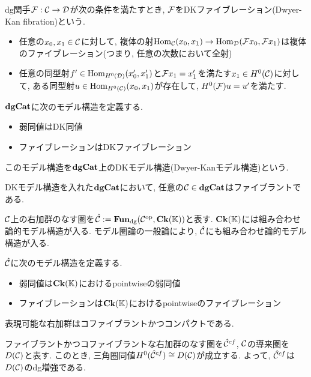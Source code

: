 \documentclass[uplatex, a4paper, 14Q, dvipdfmx]{jsarticle}
\begin{document}
\begin{definition}[DKファイブレーション]
  dg関手$\mathcal{F} : \mathcal{C} \to \mathcal{D}$が次の条件を満たすとき, $\mathcal{F}$をDKファイブレーション(Dwyer-Kan fibration)という.
  \begin{itemize}
    \item 任意の$x_0,x_1 \in \mathcal{C}$に対して, 複体の射$\mathrm{Hom}_{\mathcal{C}}(x_0,x_1) \to \mathrm{Hom}_{\mathcal{D}}(\mathcal{F} x_0,\mathcal{F} x_1)$は複体のファイブレーション(つまり, 任意の次数において全射)
    \item 任意の同型射$f' \in \mathrm{Hom}_{H^0(\mathcal{D})}(x_0',x_1')$と$\mathcal{F} x_1 = x_1'$を満たす$x_1 \in H^0(\mathcal{C})$に対して, ある同型射$u \in \mathrm{Hom}_{H^0(\mathcal{C})}(x_0,x_1)$が存在して, $H^0(\mathcal{F}) u = u'$を満たす. 
  \end{itemize}
\end{definition}

\begin{definition}
  $\mathbf{dgCat}$に次のモデル構造を定義する.
  \begin{itemize}
    \item 弱同値はDK同値
    \item ファイブレーションはDKファイブレーション
  \end{itemize}
  このモデル構造を$\mathbf{dgCat}$上のDKモデル構造(Dwyer-Kanモデル構造)という. 
\end{definition}

\begin{remark}
  DKモデル構造を入れた$\mathbf{dgCat}$において, 任意の$\mathcal{C} \in \mathbf{dgCat}$はファイブラントである. 
\end{remark}

$\mathcal{C}$上の右加群のなす圏を$\hat{\mathcal{C}} := \mathbf{Fun}_{\mathrm{dg}}(\mathcal{C}^{\mathrm{op}},\mathbf{Ck}(\mathbb{K}))$と表す. 
$\mathbf{Ck}(\mathbb{K})$には組み合わせ論的モデル構造が入る. 
モデル圏論の一般論により, $\hat{\mathcal{C}}$にも組み合わせ論的モデル構造が入る. 

\begin{definition}
  $\hat{\mathcal{C}}$に次のモデル構造を定義する.
  \begin{itemize}
    \item 弱同値は$\mathbf{Ck}(\mathbb{K})$におけるpointwiseの弱同値
    \item ファイブレーションは$\mathbf{Ck}(\mathbb{K})$におけるpointwiseのファイブレーション
  \end{itemize}
\end{definition}

\begin{remark}
  表現可能な右加群はコファイブラントかつコンパクトである. 
\end{remark}

\begin{remark}
  ファイブラントかつコファイブラントな右加群のなす圏を$\hat{\mathcal{C}}^{cf}$, $\mathcal{C}$の導来圏を$D(\mathcal{C})$と表す.
  このとき, 三角圏同値$H^0(\hat{\mathcal{C}}^{cf}) \cong D(\mathcal{C})$が成立する.
  よって, $\hat{\mathcal{C}}^{cf}$は$D(\mathcal{C})$のdg増強である. 
\end{remark}
\end{document}
